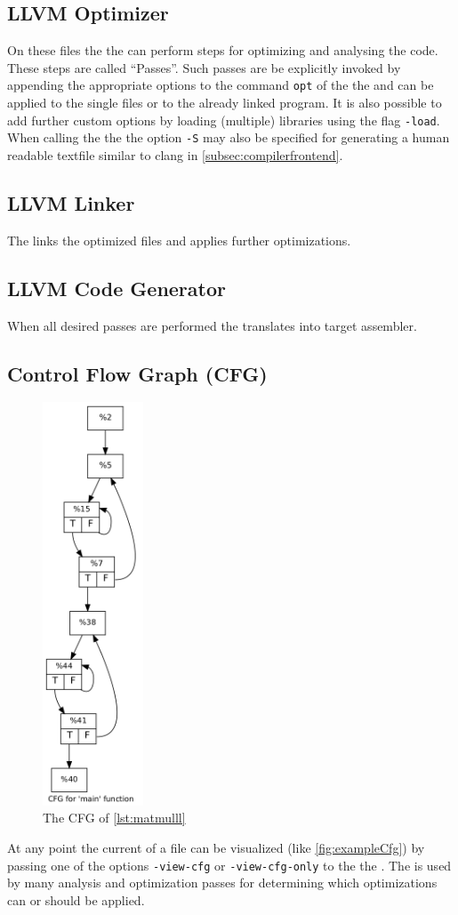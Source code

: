 \subsection{LLVM Optimizer}\label{subsec:optimizer}
On these files the the \opt can perform steps for optimizing and analysing the code.
These steps are called \enquote{Passes}.
Such passes are be explicitly invoked by appending the appropriate options to the command \texttt{opt} of the the \opt and can be applied to the single files or to the already linked program.
It is also possible to add further custom options by loading (multiple) libraries using the flag \texttt{-load}.
When calling the the \opt the option \texttt{-S} may also be specified for generating a human readable textfile similar to clang in \autoref{subsec:compilerfrontend}.
\subsection{LLVM Linker}
The \linker links the optimized \llvmir files and applies further optimizations.
\subsection{LLVM Code Generator}
When all desired passes are performed the \generator translates \llvmir into target assembler.
\subsection{Control Flow Graph (CFG)}
\begin{figure}
    \caption{The CFG of \autoref{lst:matmulll}}
    \label{fig:exampleCfg}
    \includegraphics[height=12cm]{gfx/matmulCfg.png}
\end{figure}
At any point the current \cfg of a \llvmir file can be visualized (like \autoref{fig:exampleCfg}) by passing one of the options \texttt{-view-cfg} or \texttt{-view-cfg-only} to the the \opt.
The \cfg is used by many analysis and optimization passes for determining which optimizations can or should be applied.
